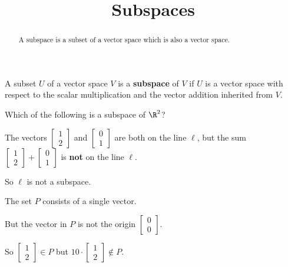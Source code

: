 \documentclass{ximera}
\title{Subspaces}
\begin{document}
\begin{abstract}
  A subspace is a subset of a vector space which is also a vector space.
\end{abstract}

\begin{definition}
  A subset $U$ of a vector space $V$ is a \textbf{subspace} of $V$ if
  $U$ is a vector space with respect to the scalar multiplication and
  the vector addition inherited from $V$.
\end{definition}

\begin{question}
  Which of the following is a subspace of $\R^2$?
  \begin{solution}
    \begin{hint}
      The vectors $\begin{bmatrix} 1 \\ 2\end{bmatrix}$ and $\begin{bmatrix} 0 \\ 1\end{bmatrix}$ are both on the line $\ell$, but the sum $\begin{bmatrix} 1 \\ 2\end{bmatrix} + \begin{bmatrix} 0 \\ 1\end{bmatrix}$ is \textbf{not} on the line $\ell.$
    \end{hint}

    \begin{hint}
      So $\ell$ is not a subspace.
    \end{hint}

    \begin{hint}
      The set $P$ consists of a single vector.
    \end{hint}

    \begin{hint}
      But the vector in $P$ is not the origin $\begin{bmatrix} 0 \\ 0 \end{bmatrix}$.
    \end{hint}

    \begin{hint}
      So $\begin{bmatrix} 1 \\ 2 \end{bmatrix} \in P$ but $10 \cdot \begin{bmatrix} 1 \\ 2 \end{bmatrix} \not\in P$.
    \end{hint}


\end{solution}
\end{question}
\end{document}
